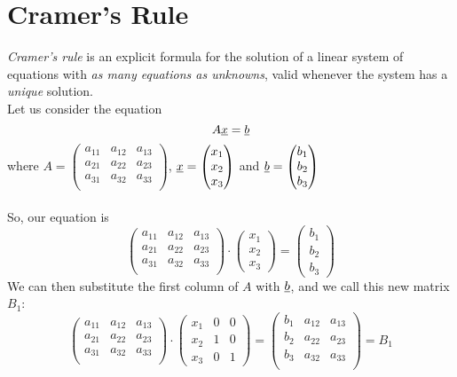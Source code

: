 \section{Cramer's Rule}
\textit{Cramer's rule} is an explicit formula for the solution of a linear system of equations with \textit{as many equations as unknowns}, valid whenever the system has a \textit{unique} solution.\\
Let us consider the equation $$A\underline{x} = \underline{b}$$ 
where $A = \begin{pmatrix}
a_{11} & a_{12} & a_{13}\\
a_{21} & a_{22} & a_{23}\\
a_{31} & a_{32} & a_{33}\\
\end{pmatrix}$, $\underline{x} = \begin{pmatrix}
x_1\\
x_2\\
x_3
\end{pmatrix}$ and $\underline{b} = \begin{pmatrix}
b_1\\
b_2\\
b_3
\end{pmatrix}$\\ \\
So, our equation is
\[
\begin{pmatrix}
a_{11} & a_{12} & a_{13}\\
a_{21} & a_{22} & a_{23}\\
a_{31} & a_{32} & a_{33}\\
\end{pmatrix}\cdot \begin{pmatrix}
x_1\\
x_2\\
x_3
\end{pmatrix} = \begin{pmatrix}
b_1\\
b_2\\
b_3
\end{pmatrix}
\]
We can then substitute the first column of $A$ with $\underline{b}$, and we call this new matrix $B_1$:
\[
\begin{pmatrix}
a_{11} & a_{12} & a_{13}\\
a_{21} & a_{22} & a_{23}\\
a_{31} & a_{32} & a_{33}\\
\end{pmatrix}\cdot \begin{pmatrix}
x_1 & 0 & 0\\
x_2 & 1 & 0\\
x_3 & 0 & 1
\end{pmatrix} = \begin{pmatrix}
b_{1} & a_{12} & a_{13}\\
b_{2} & a_{22} & a_{23}\\
b_{3} & a_{32} & a_{33}\\
\end{pmatrix} = B_1
\]\\ \\
